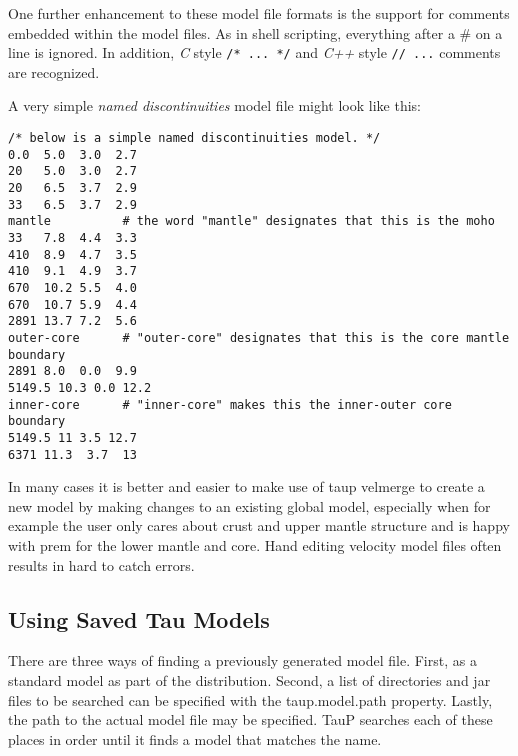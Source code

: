 One further enhancement to these model file formats is the support for comments
embedded within the model files. As in shell scripting, everything after
a \# on a line is ignored. In addition, \textit{C} style \verb"/* ... */"
and \textit{C++} style \verb"// ..." comments are recognized.

A very simple \textit{named discontinuities} model file might look like this:
\begin{verbatim}/* below is a simple named discontinuities model. */
0.0  5.0  3.0  2.7
20   5.0  3.0  2.7
20   6.5  3.7  2.9
33   6.5  3.7  2.9
mantle          # the word "mantle" designates that this is the moho
33   7.8  4.4  3.3
410  8.9  4.7  3.5
410  9.1  4.9  3.7
670  10.2 5.5  4.0
670  10.7 5.9  4.4
2891 13.7 7.2  5.6
outer-core      # "outer-core" designates that this is the core mantle boundary
2891 8.0  0.0  9.9
5149.5 10.3 0.0 12.2
inner-core      # "inner-core" makes this the inner-outer core boundary
5149.5 11 3.5 12.7
6371 11.3  3.7  13 \end{verbatim}

In many cases it is better and easier to make use of taup velmerge
to create a new model by making changes to an existing global model, especially when for example the user only cares about crust and upper mantle structure and is happy with prem for
the lower mantle and core. Hand editing velocity model files
often results in hard to catch errors.

\subsection{Using Saved Tau Models}
There are three ways of finding a previously generated model file. First, as
a standard model as part of the distribution. Second, a list of directories and jar files to
be searched can be specified with the taup.model.path property.
Lastly, the path to the actual model file may be specified.
TauP searches each of these
places in order until it finds a model that matches the name.

